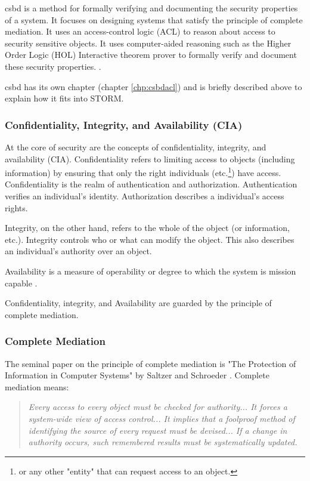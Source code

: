 \documentclass[../../main/main.tex]{subfiles}
\begin{document}
\gls{csbd} is a method for formally verifying and documenting the security properties of a system.  It focuses on designing systems that satisfy the principle of complete mediation.  It uses an access-control logic (ACL) to reason about access to security sensitive objects.  It uses computer-aided reasoning such as the Higher Order Logic (HOL) Interactive theorem prover to formally verify and document these security properties.  .

\gls{csbd} has its own chapter (chapter \ref{chp:csbdacl}) and is briefly described above to explain how it fits into STORM.

\subsubsection{Confidentiality, Integrity, and Availability (CIA) }\label{sssect:ssmts}
At the core of security are the concepts of confidentiality, integrity, and availability (CIA).  Confidentiality refers to limiting access to objects (including information) by ensuring that only the right individuals (etc.\footnote{or any other "entity" that can request access to an object.}) have access.  Confidentiality is the realm of authentication and authorization.  Authentication verifies an individual's identity.  Authorization describes a individual's access rights. 

Integrity, on the other hand, refers to the whole of the object (or information, etc.). Integrity controls who or what can modify the object. This also describes an individual's authority over an object.

Availability is a measure of operability or degree to which the system is mission capable \cite {availability}. 

Confidentiality, integrity, and Availability are guarded by the principle of complete mediation.  


\subsubsection{Complete Mediation}\label{sssec:strommediate}
The seminal paper on the principle of complete mediation is "The Protection of Information in Computer Systems" by Saltzer and Schroeder \cite{saltzer}.  Complete mediation means:
\begin{quote}
\textit{
Every access to every object must be checked for authority... It forces a system-wide view of access control... It implies that a foolproof method of identifying the source of every request must be devised... If a change in authority occurs, such remembered results must be systematically updated.} 
\end{quote}
\end{document}
